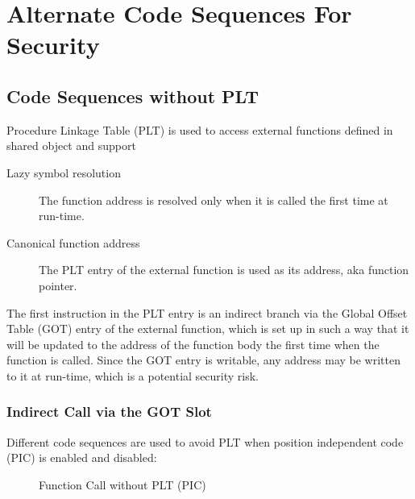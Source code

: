 \chapter{Alternate Code Sequences For Security}

\section{Code Sequences without PLT}

Procedure Linkage Table (PLT) is
used to access external functions defined in shared object and support

\begin{description}
  \item[Lazy symbol resolution] The function address is resolved only
    when it is called the first time at run-time.
  \item[Canonical function address] The PLT entry of the external
    function is used as its address, aka function pointer.
\end{description}

The first instruction in the PLT entry is an indirect branch via the
Global Offset Table (GOT) entry of
the external function, which is set up in such a way that it will be
updated to the address of the function body the first time when the
function is called.  Since the GOT entry is writable, any address may
be written to it at run-time, which is a potential security risk.

\subsection{Indirect Call via the GOT Slot}

Different code sequences are used to avoid PLT when position independent
code (PIC) is enabled and disabled:

\begin{figure}[H]
\Hrule
\caption{Function Call without PLT (PIC)}
\begin{center}
\small{}
\end{center}
\Hrule
\end{figure}

